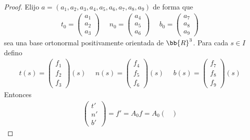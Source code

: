\begin{teo}
\begin{proof}
        Elijo $a=(a_1, a_2, a_3, a_4, a_5, a_6, a_7, a_8, a_9)$ de forma que 
        \begin{gather*}
            t_0 = \begin{pmatrix}
                a_1 \\
                a_2\\
                a_3
            \end{pmatrix} \ \ \ \ \ \ 
            n_0 = \begin{pmatrix}
                a_4 \\
                a_5\\
                a_6
            \end{pmatrix} \ \ \ \ \ \ 
            b_0 = \begin{pmatrix}
                a_7 \\
                a_8\\
                a_9
            \end{pmatrix}
        \end{gather*}
        sea una base ortonormal positivamente orientada de $\bb{R}^3$. Para cada $s\in I$ defino 
        \begin{gather*}
            t(s) = \begin{pmatrix}
                f_1 \\
                f_2\\
                f_3
            \end{pmatrix}(s) \ \ \ \ \ \ 
            n(s) = \begin{pmatrix}
                f_4 \\
                f_5\\
                f_6
            \end{pmatrix}(s) \ \ \ \ \ \ 
            b(s) = \begin{pmatrix}
                f_7 \\
                f_8\\
                f_9
            \end{pmatrix}(s)
        \end{gather*}
        Entonces 
        \begin{gather*}
            \begin{pmatrix}
                t'\\
                n'\\
                b'
            \end{pmatrix} = f' = A_0f = A_0 \begin{pmatrix}

\end{pmatrix}
\end{gather*}
\end{proof}
\end{teo}
